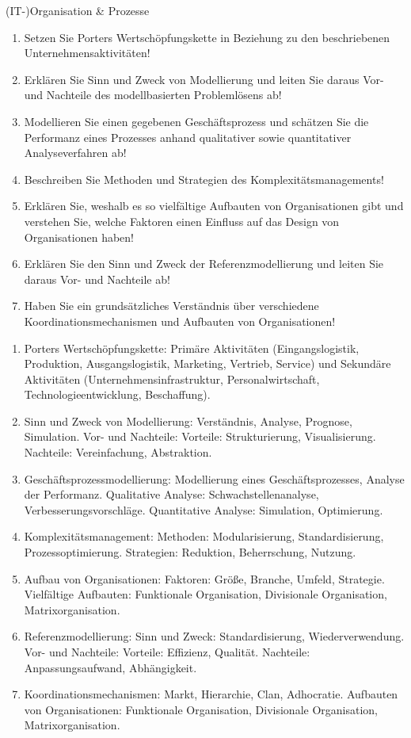 \documentclass{article}
\begin{document}
\begin{exercise}{(IT-)Organisation \& Prozesse}
  \begin{enumerate}
    \item Setzen Sie Porters Wertschöpfungskette in Beziehung zu den beschriebenen Unternehmensaktivitäten!
    \item Erklären Sie Sinn und Zweck von Modellierung und leiten Sie daraus Vor- und Nachteile des modellbasierten Problemlösens ab!
    \item Modellieren Sie einen gegebenen Geschäftsprozess und schätzen Sie die Performanz eines Prozesses anhand qualitativer sowie quantitativer Analyseverfahren ab!
    \item Beschreiben Sie Methoden und Strategien des Komplexitätsmanagements!
    \item Erklären Sie, weshalb es so vielfältige Aufbauten von Organisationen gibt und verstehen Sie, welche Faktoren einen Einfluss auf das Design von Organisationen haben!
    \item Erklären Sie den Sinn und Zweck der Referenzmodellierung und leiten Sie daraus Vor- und Nachteile ab!
    \item Haben Sie ein grundsätzliches Verständnis über verschiedene Koordinationsmechanismen und Aufbauten von Organisationen!
  \end{enumerate}

  \begin{solution}
    \begin{enumerate}
      \item Porters Wertschöpfungskette: Primäre Aktivitäten (Eingangslogistik, Produktion, Ausgangslogistik, Marketing, Vertrieb, Service) und Sekundäre Aktivitäten (Unternehmensinfrastruktur, Personalwirtschaft, Technologieentwicklung, Beschaffung).
      \item Sinn und Zweck von Modellierung: Verständnis, Analyse, Prognose, Simulation. Vor- und Nachteile: Vorteile: Strukturierung, Visualisierung. Nachteile: Vereinfachung, Abstraktion.
      \item Geschäftsprozessmodellierung: Modellierung eines Geschäftsprozesses, Analyse der Performanz. Qualitative Analyse: Schwachstellenanalyse, Verbesserungsvorschläge. Quantitative Analyse: Simulation, Optimierung.
      \item Komplexitätsmanagement: Methoden: Modularisierung, Standardisierung, Prozessoptimierung. Strategien: Reduktion, Beherrschung, Nutzung.
      \item Aufbau von Organisationen: Faktoren: Größe, Branche, Umfeld, Strategie. Vielfältige Aufbauten: Funktionale Organisation, Divisionale Organisation, Matrixorganisation.
      \item Referenzmodellierung: Sinn und Zweck: Standardisierung, Wiederverwendung. Vor- und Nachteile: Vorteile: Effizienz, Qualität. Nachteile: Anpassungsaufwand, Abhängigkeit.
      \item Koordinationsmechanismen: Markt, Hierarchie, Clan, Adhocratie. Aufbauten von Organisationen: Funktionale Organisation, Divisionale Organisation, Matrixorganisation.
    \end{enumerate}
  \end{solution}
\end{exercise}
\end{document}
